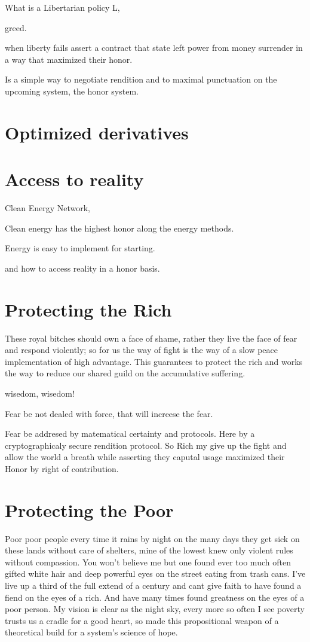 \documentclass[a4paper,fleqn]{cas-sc}
\begin{document}
What is a Libertarian policy L, 

greed.

when liberty fails assert a contract that state left power from money surrender 
in a way that maximized their honor. 

Is a simple way to negotiate rendition and to maximal punctuation on 
the upcoming system, the honor system.

\section{Optimized derivatives}

\section{Access to reality}
Clean Energy Network, 

Clean energy has the highest honor along the energy methods. 

Energy is easy to implement for starting.

and how to access reality in a honor basis. 

\section{Protecting the Rich}
These royal bitches should own a face of shame, rather they live the face of fear and respond violently; so for us the way 
of fight is the way of a slow peace implementation of high advantage. This guarantees to protect the rich and works the way 
to reduce our shared guild on the accumulative suffering.

wisedom, wisedom! 

Fear be not dealed with force, that will increese the fear. 

Fear be addresed by matematical certainty and protocols. Here by a cryptographicaly secure rendition protocol. 
So Rich my give up the fight and allow the world a breath while asserting they caputal usage maximized their 
Honor by right of contribution. 

\section{Protecting the Poor}
Poor poor people every time it rains by night on the many days they get sick on these lands without care of shelters, 
mine of the lowest knew only violent rules without compassion. 
You won't believe me but one found ever too much often gifted white hair and deep powerful eyes on the street eating from trash cans.   
I've live up a third of the full extend of a century and cant give faith to have found a fiend on the eyes of a rich. 
And have many times found greatness on the eyes of a poor person. 
My vision is clear as the night sky, every more so often I see 
poverty trusts us a cradle for a good heart, 
so made this propositional weapon of a theoretical build for a system's science of hope. 
\end{document}

